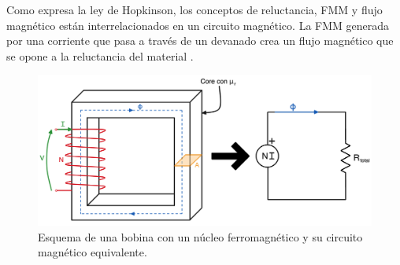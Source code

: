 Como expresa la ley de Hopkinson, los conceptos de reluctancia, FMM y flujo magnético están interrelacionados en un circuito magnético. La FMM generada por una corriente que pasa a través de un devanado crea un flujo magnético que se opone a la reluctancia del material \citep{griffiths2005}\citep{tipler2008}.

    \begin{figure}[H]
        \centering %
        \includegraphics[width=\textwidth]{FigurasMemoria/circuitoMagExplicacion.png}
        \caption{Esquema de una bobina con un núcleo ferromagnético y su circuito magnético equivalente.}
        \label{fig:circuitoMagExplicacion} %
    \end{figure}